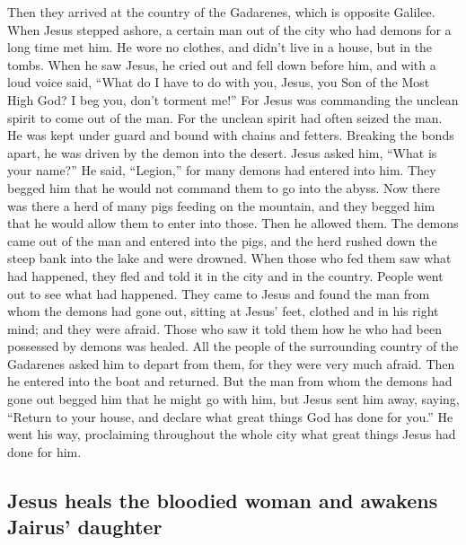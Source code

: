  Then they arrived at the country of the Gadarenes, which
is opposite Galilee.  When Jesus stepped ashore, a
certain man out of the city who had demons for a long time met him. He
wore no clothes, and didn't live in a house, but in the tombs.
 When he saw Jesus, he cried out and fell down before
him, and with a loud voice said, ``What do I have to do with you, Jesus,
you Son of the Most High God? I beg you, don't torment me!''
 For Jesus was commanding the unclean spirit to come out
of the man. For the unclean spirit had often seized the man. He was kept
under guard and bound with chains and fetters. Breaking the bonds apart,
he was driven by the demon into the desert.  Jesus asked
him, ``What is your name?'' He said, ``Legion,'' for many demons had
entered into him.  They begged him that he would not
command them to go into the abyss.  Now there was there a
herd of many pigs feeding on the mountain, and they begged him that he
would allow them to enter into those. Then he allowed them.
 The demons came out of the man and entered into the
pigs, and the herd rushed down the steep bank into the lake and were
drowned.  When those who fed them saw what had happened,
they fled and told it in the city and in the country. 
People went out to see what had happened. They came to Jesus and found
the man from whom the demons had gone out, sitting at Jesus' feet,
clothed and in his right mind; and they were afraid. 
Those who saw it told them how he who had been possessed by demons was
healed.  All the people of the surrounding country of the
Gadarenes asked him to depart from them, for they were very much afraid.
Then he entered into the boat and returned.  But the man
from whom the demons had gone out begged him that he might go with him,
but Jesus sent him away, saying,  ``Return to your house,
and declare what great things God has done for you.'' He went his way,
proclaiming throughout the whole city what great things Jesus had done
for him.

\hypertarget{jesus-heals-the-bloodied-woman-and-awakens-jairus-daughter}{%
\subsection{Jesus heals the bloodied woman and awakens Jairus'
daughter}\label{jesus-heals-the-bloodied-woman-and-awakens-jairus-daughter}}

